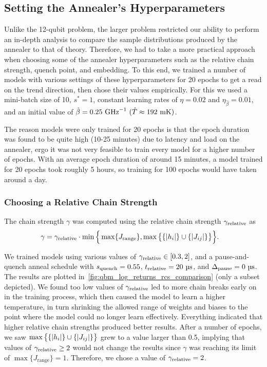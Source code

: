 \subsection{Setting the Annealer's Hyperparameters}\label{sec:qbm_hyperparameters}
Unlike the 12-qubit problem, the larger problem restricted our ability to perform an in-depth analysis to compare the sample distributions produced by the annealer to that of theory.
Therefore, we had to take a more practical approach when choosing some of the annealer hyperparameters such as the relative chain strength, quench point, and embedding.
To this end, we trained a number of models with various settings of these hyperparameters for 20 epochs to get a read on the trend direction, then chose their values empirically.
For this we used a mini-batch size of 10, \( s^* = 1 \), constant learning rates of \( \eta = 0.02 \) and \( \eta_{\hat{\beta}} = 0.01 \), and an initial value of \( \betahat = 0.25 \ \si{\giga\hertz}^{-1} \ (\hat{T} \approx 192 \ \si{\milli\kelvin}) \).

The reason models were only trained for 20 epochs is that the epoch duration was found to be quite high (10-25 minutes) due to latency and load on the annealer, ergo it was not very feasible to train every model for a higher number of epochs.
With an average epoch duration of around 15 minutes, a model trained for 20 epochs took roughly 5 hours, so training for 100 epochs would have taken around a day.

\subsubsection{Choosing a Relative Chain Strength}\label{sec:qbm_rcs}
The chain strength \( \gamma \) was computed using the relative chain strength \( \gamma_{\text{relative}} \) as
\begin{align}
    \gamma
        &= \gamma_{\text{relative}} \cdot \min\Big\{
            \max\{J_\text{range}\}, \max\big\{\{\lvert h_i\rvert\} \cup \{\lvert J_{ij}\rvert\}\big\}
        \Big\}.
\end{align}

We trained models using various values of \( \gamma_{\text{relative}} \in [0.3, 2] \), and a pause-and-quench anneal schedule with \( s_{\text{quench}} = 0.55 \), \( t_{\text{relative}} = 20 \ \si{\micro\second} \), and \( \Deltapause = 0 \ \si{\micro\second} \).
The results are plotted in~\cref{fig:qbm_log_returns_rcs_comparison} (only a subset depicted).
We found too low values of \( \gamma_{\text{relative}} \) led to more chain breaks early on in the training process, which then caused the model to learn a higher temperature, in turn shrinking the allowed range of weights and biases to the point where the model could no longer learn effectively.
Everything indicated that higher relative chain strengths produced better results.
After a number of epochs, we saw \( \max\big\{ \{\lvert h_i\rvert\} \cup \{\lvert J_{ij}\rvert\} \big\} \) grew to a value larger than 0.5, implying that values of \( \gamma_{\text{relative}} \ge 2 \) would not change the results since \( \gamma \) was reaching its limit of \( \max\{J_\text{range}\} = 1 \).
Therefore, we chose a value of \( \gamma_{\text{relative}} = 2 \).

